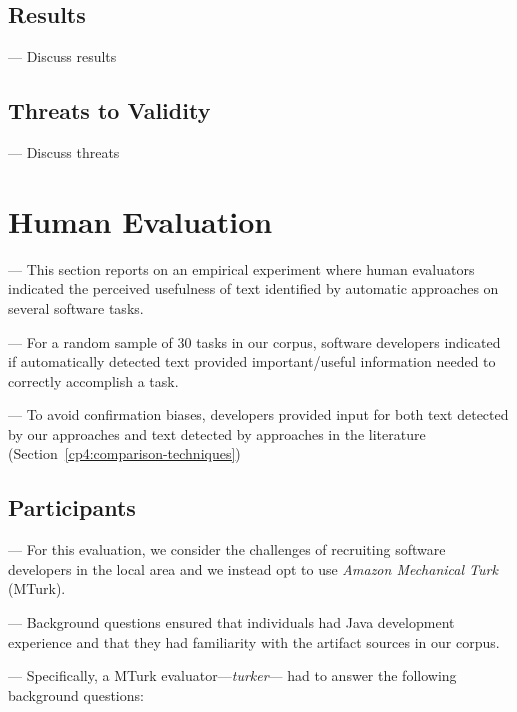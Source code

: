 \subsection{Results}

--- Discuss results \vspace{3mm}

\subsection{Threats to Validity}

--- Discuss threats \vspace{3mm}

\clearpage


\section{Human Evaluation}

--- This section reports on an empirical experiment where human evaluators 
indicated the perceived usefulness of text identified by automatic approaches on several software tasks.

--- For a random sample of 30 tasks in our corpus, software developers indicated if automatically detected text provided important/useful information needed to correctly accomplish a task.

--- To avoid confirmation biases, developers provided input for both text detected by our approaches and text detected by approaches in the literature (Section~\ref{cp4:comparison-techniques})



\subsection{Participants}

--- For this evaluation, we consider the challenges of recruiting software developers in the local area and we instead opt to use 
\textit{Amazon Mechanical Turk}~\cite{mturk} (MTurk).

--- Background questions ensured that individuals had Java development experience and that they had familiarity with the artifact sources in our corpus.

--- Specifically, a MTurk evaluator---\textit{turker}--- had to answer the following background questions:


